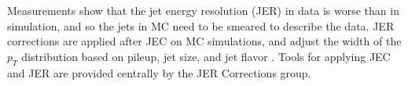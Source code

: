 Measurements show that the jet energy resolution (JER) in data is worse than in simulation, and so the jets in MC need to be smeared to describe the data. JER corrections are applied after JEC on MC simulations, and adjust the width of the $p_{T}$ distribution based on pileup, jet size, and jet flavor \cite{twiki_JetResolution_JER}. Tools for applying JEC and JER are provided centrally by the JER Corrections group. 